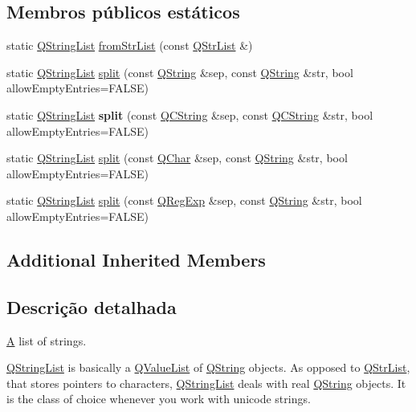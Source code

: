\subsection*{Membros públicos estáticos}
\begin{DoxyCompactItemize}
\item 
static \hyperlink{class_q_string_list}{Q\-String\-List} \hyperlink{class_q_string_list_a14de7077da58a69fccc730eebb7b1916}{from\-Str\-List} (const \hyperlink{class_q_str_list}{Q\-Str\-List} \&)
\item 
static \hyperlink{class_q_string_list}{Q\-String\-List} \hyperlink{class_q_string_list_a3bc6fc9aa1be1dbc5989b39b37199765}{split} (const \hyperlink{class_q_string}{Q\-String} \&sep, const \hyperlink{class_q_string}{Q\-String} \&str, bool allow\-Empty\-Entries=F\-A\-L\-S\-E)
\item 
\hypertarget{class_q_string_list_a3752269bb7360ba242768a55e1494821}{static \hyperlink{class_q_string_list}{Q\-String\-List} {\bfseries split} (const \hyperlink{class_q_c_string}{Q\-C\-String} \&sep, const \hyperlink{class_q_c_string}{Q\-C\-String} \&str, bool allow\-Empty\-Entries=F\-A\-L\-S\-E)}\label{class_q_string_list_a3752269bb7360ba242768a55e1494821}

\item 
static \hyperlink{class_q_string_list}{Q\-String\-List} \hyperlink{class_q_string_list_ad399343d2b072bb6c24c7822faa597a0}{split} (const \hyperlink{class_q_char}{Q\-Char} \&sep, const \hyperlink{class_q_string}{Q\-String} \&str, bool allow\-Empty\-Entries=F\-A\-L\-S\-E)
\item 
static \hyperlink{class_q_string_list}{Q\-String\-List} \hyperlink{class_q_string_list_a95c3f64b0440a87838320b903144c380}{split} (const \hyperlink{class_q_reg_exp}{Q\-Reg\-Exp} \&sep, const \hyperlink{class_q_string}{Q\-String} \&str, bool allow\-Empty\-Entries=F\-A\-L\-S\-E)
\end{DoxyCompactItemize}
\subsection*{Additional Inherited Members}


\subsection{Descrição detalhada}
\hyperlink{class_a}{A} list of strings. 

\hyperlink{class_q_string_list}{Q\-String\-List} is basically a \hyperlink{class_q_value_list}{Q\-Value\-List} of \hyperlink{class_q_string}{Q\-String} objects. As opposed to \hyperlink{class_q_str_list}{Q\-Str\-List}, that stores pointers to characters, \hyperlink{class_q_string_list}{Q\-String\-List} deals with real \hyperlink{class_q_string}{Q\-String} objects. It is the class of choice whenever you work with unicode strings.

